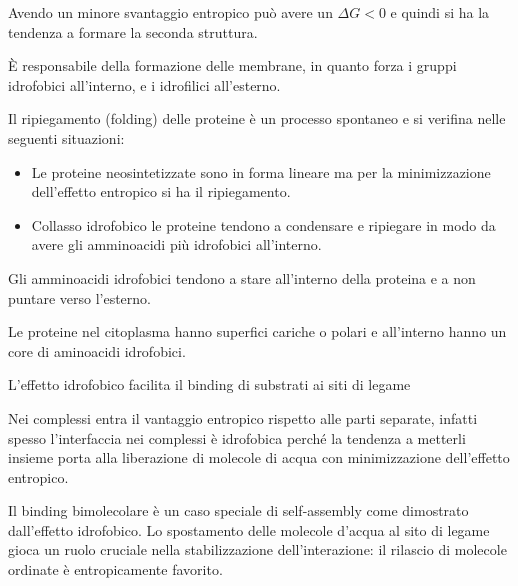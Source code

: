 
Avendo un minore svantaggio entropico può avere un $\Delta G < 0$
e quindi si ha la tendenza a formare la seconda struttura.

È responsabile della formazione delle membrane, in quanto forza i gruppi idrofobici all'interno, e i idrofilici all'esterno.

Il ripiegamento (folding) delle proteine è un processo spontaneo e si verifina nelle seguenti situazioni:
\begin{itemize}
\item
  Le proteine neosintetizzate sono in forma lineare ma per la
  minimizzazione dell'effetto entropico si ha il ripiegamento.
\item
  Collasso idrofobico le proteine tendono a condensare e ripiegare in
  modo da avere gli amminoacidi più idrofobici all'interno.
\end{itemize}

Gli amminoacidi idrofobici tendono a stare all'interno della proteina e a non puntare verso l'esterno.


Le proteine nel citoplasma hanno superfici cariche o polari e all'interno hanno un core di aminoacidi idrofobici.

L'effetto idrofobico facilita il binding di substrati ai siti di legame

Nei complessi entra il vantaggio entropico rispetto alle parti
separate, infatti spesso l'interfaccia nei complessi è idrofobica
perché la tendenza a metterli insieme porta alla liberazione di
molecole di acqua con minimizzazione dell'effetto entropico.

Il binding bimolecolare è un caso speciale di self-assembly come
dimostrato dall'effetto idrofobico. Lo spostamento delle molecole
d'acqua al sito di legame gioca un ruolo cruciale nella
stabilizzazione dell'interazione: il rilascio di molecole ordinate è
entropicamente favorito.
